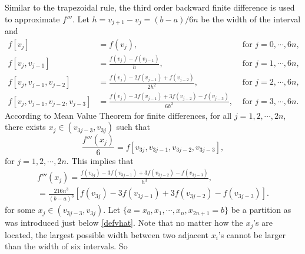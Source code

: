 \documentclass{iitthesis}
\DeclareMathOperator{\Var}{Var}
\theoremstyle{definition}
\theoremstyle{remark}
\begin{document}
Similar to the trapezoidal rule, the third order backward finite difference is used to approximate $f'''$. Let $h=v_{j+1}-v_{j}=(b-a)/6n$ be the width of the interval and
\begin{align*}
  f[v_{j}]&=f(v_{j}), &\text{ for } j=0,\cdots, 6n,\\
  f[v_{j},v_{j-1}]&=\frac{f(v_{j})-f(v_{j-1})}{h},&\text{ for } j=1, \cdots, 6n,\\
  f[v_{j},v_{j-1},v_{j-2}]&=\frac{f(v_{j})-2f(v_{j-1})+f(v_{j-2})}{2h^2},&\text{ for } j=2, \cdots, 6n,\\
  f[v_{j},v_{j-1},v_{j-2},v_{j-3}]&=\frac{f(v_{j})-3f(v_{j-1})+3f(v_{j-2})-f(v_{j-3})}{6h^3}, &\text{ for } j=3, \cdots, 6n.
\end{align*}
According to Mean Value Theorem for finite differences, for all $j=1,2,\cdots,2n$, there exists $x_j\in (v_{3j-3},v_{3j})$ such that
\begin{equation*}
    \frac{f'''(x_j)}{6}=f[v_{3j},v_{3j-1},v_{3j-2},v_{3j-3}],
\end{equation*}
for $j = 1, 2, \cdots, 2n.$ This implies that
\begin{multline}\label{ftriprime}
  f'''(x_j)=\frac{f(v_{3j})-3f(v_{3j-1})+3f(v_{3j-2})-f(v_{3j-3})}{h^3},\\=\frac{216n^3}{(b-a)^3}[f(v_{3j})-3f(v_{3j-1})+3f(v_{3j-2})-f(v_{3j-3})].
\end{multline}
for some $x_j\in (v_{3j-3},v_{3j})$. Let $\{a=x_{0}, x_{1},\cdots,x_{n},x_{2n+1}=b\}$ be a partition as was introduced just below \eqref{defvhat}. Note that no matter how the $x_j$'s are located, the largest possible width between two adjacent $x_{i}$'s cannot be larger than the width of six intervals. So
\end{document}
